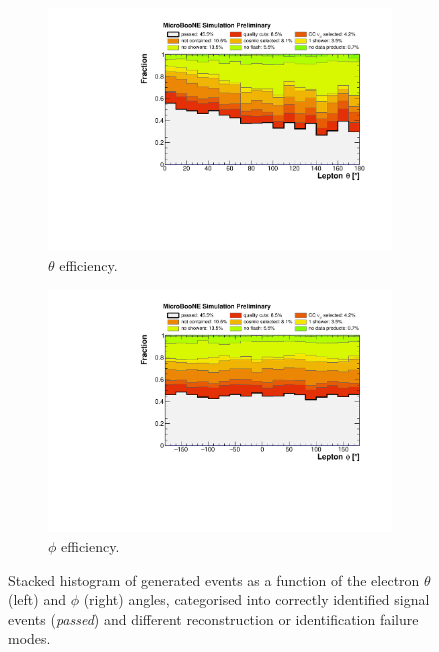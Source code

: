 \begin{figure}
\centering
  \begin{subfigure}{0.48\textwidth}
    \includegraphics[width=\linewidth]{figures/ineff_theta.pdf}
    \caption{$\theta$ efficiency.} 
  \end{subfigure}
    \begin{subfigure}{0.48\textwidth}
    \includegraphics[width=\linewidth]{figures/ineff_phi.pdf}
    \caption{$\phi$ efficiency.} 
  \end{subfigure}
  \caption{Stacked histogram of generated events as a function of the electron $\theta$ (left) and $\phi$ (right) angles, categorised into correctly identified signal events {(\emph{passed})} and different reconstruction or identification failure modes.}
  \label{fig:ineff_angles}
\end{figure}

